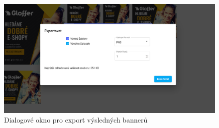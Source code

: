     \begin{figure}[h]
        \includegraphics[width=1.0\textwidth]{Figures/editor/export.png}
        \caption{Dialogové okno pro export výsledných bannerů}
        \label{fig:editor:exporting}
    \end{figure}




\endinput